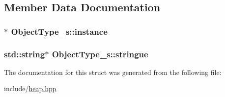 \subsection{Member Data Documentation}
\hypertarget{structObjectType__s_ace1fa4b359f32f92954516a5de896350}{
\subsubsection[{instance}]{$\ast$ Object\+Type\+\_\+s\+::instance}}\label{structObjectType__s_ace1fa4b359f32f92954516a5de896350}
\hypertarget{structObjectType__s_a3ce93c0128356d1776c374e864ec2a13}{
\subsubsection[{stringue}]{\setlength{\rightskip}{0pt plus 5cm}std\+::string$\ast$ Object\+Type\+\_\+s\+::stringue}}\label{structObjectType__s_a3ce93c0128356d1776c374e864ec2a13}


The documentation for this struct was generated from the following file\+:\begin{DoxyCompactItemize}
\item 
include/\hyperlink{heap_8hpp}{heap.\+hpp}\end{DoxyCompactItemize}
